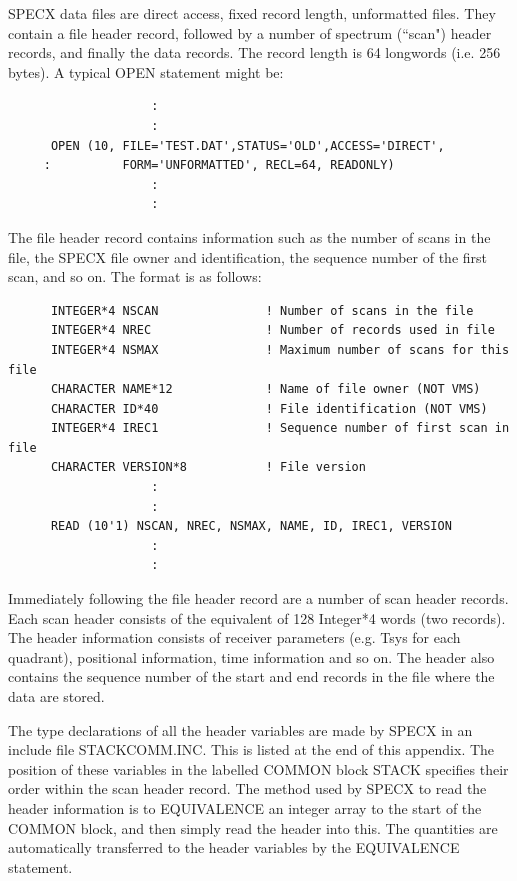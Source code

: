 \documentclass[11pt,twoside]{report}
\begin{document}
SPECX data files are direct access, fixed record length, unformatted
files. They contain a file header record, followed by a number of
spectrum (``scan") header records, and finally the data records. The
record length is 64 longwords (i.e. 256 bytes). A typical OPEN
statement might be:
\begin{verbatim}
                    :
                    :
      OPEN (10, FILE='TEST.DAT',STATUS='OLD',ACCESS='DIRECT',
     :          FORM='UNFORMATTED', RECL=64, READONLY)
                    :
                    :
\end{verbatim}

The file header record contains information such as the number of
scans in the file, the SPECX file owner and identification, the
sequence number of the first scan, and so on. The format is as
follows:

\begin{verbatim}
      INTEGER*4 NSCAN               ! Number of scans in the file
      INTEGER*4 NREC                ! Number of records used in file
      INTEGER*4 NSMAX               ! Maximum number of scans for this file
      CHARACTER NAME*12             ! Name of file owner (NOT VMS)
      CHARACTER ID*40               ! File identification (NOT VMS)
      INTEGER*4 IREC1               ! Sequence number of first scan in file
      CHARACTER VERSION*8           ! File version
                    :
                    :
      READ (10'1) NSCAN, NREC, NSMAX, NAME, ID, IREC1, VERSION
                    :
                    :
\end{verbatim}

Immediately following the file header record are a number of scan
header records. Each scan header consists of the equivalent of 128
Integer*4 words (two records). The header information consists of
receiver parameters (e.g. Tsys for each quadrant), positional
information, time information and so on. The header also contains the
sequence number of the start and end records in the file where the
data are stored.

The type declarations of all the header variables are made by SPECX in
an include file STACKCOMM.INC. This is listed at the end of this appendix. The
position of these variables in the labelled COMMON block STACK
specifies their order within the scan header record. The method used
by SPECX to read the header information is to EQUIVALENCE an integer
array to the start of the COMMON block, and then simply read the
header into this. The quantities are automatically transferred to the
header variables by the EQUIVALENCE statement.
\end{document}
